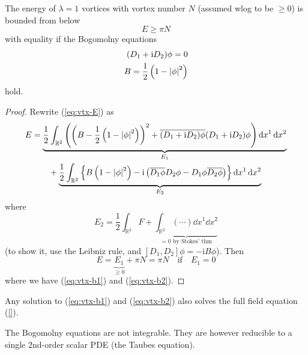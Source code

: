 \documentclass[a4paper,11pt]{article}
\begin{document}
    \begin{thm}
        The energy of $\lambda = 1$ vortices with vortex number $N$ (assumed wlog to be $\geq 0$) is bounded from below 
        \begin{equation}
            E \geq \pi N 
        \end{equation}
        with equality if the Bogomolny equations 
        \begin{align}
            (D_1 + \mathrm{i} D_2) \phi = 0 \label{eq:vtx-b1}\\
            B = \frac{1}{2} \left( 1 - \abs{\phi}^2 \right)\label{eq:vtx-b2}
        \end{align}
        hold.
    \end{thm}
    \begin{proof}
        Rewrite (\ref{eq:vtx-E}) as 
        \begin{equation}
            \begin{split}
                E & = \underbrace{\frac{1}{2} \int_{\mathbb{R}^2} \left( \left( B - \frac{1}{2} \left( 1 - \abs{\phi}^2 \right) \right)^2 + \overline{(D_1 + \mathrm{i} D_2)\phi} (D_1 + \mathrm{i} D_2) \phi \right) \dd{x^1} \dd{x^2}}_{E_1}\\
                & \qquad + \underbrace{\frac{1}{2} \int_{\mathbb{R}^2} \left\{ B \left( 1 - \abs{\phi}^2 \right) - \mathrm{i}\left( \overline{D_1 \phi} D_2 \phi - D_1 \phi \overline{D_2 \phi}\right) \right\} \dd{x^1} \dd{x^2}}_{E_2}
            \end{split}
        \end{equation}
        where 
        \begin{equation}
            E_2 = \frac{1}{2} \int_{\mathbb{R}^2} F + \underbrace{\int_{\mathbb{R}^2} \left( \cdots \right) \dd{x^1} \dd{x^2}}_{=0 \text{ by Stokes' thm}}
        \end{equation}
        (to show it, use the Leibniz rule, and $[D_1, D_2] \phi = -\mathrm{i} B \phi$). Then
        \begin{equation}
            E = {\underbrace{E_1}_{\geq 0}} + \pi N = \pi N \quad \text{if} \quad E_1 = 0
        \end{equation}
        where we have (\ref{eq:vtx-b1}) and (\ref{eq:vtx-b2}).
    \end{proof}

    Any solution to (\ref{eq:vtx-b1}) and (\ref{eq:vtx-b2}) also solves the full field equation (\ref{}).

    The Bogomolny equations are not integrable. They are however reducible to a single 2nd-order scalar PDE (the Taubes equation). 
\end{document}
